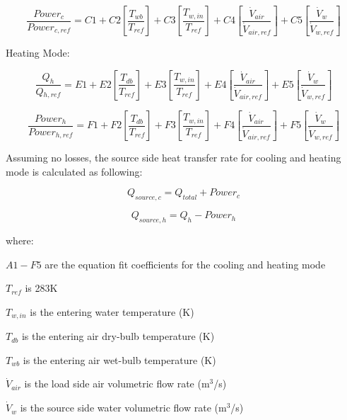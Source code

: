 \begin{equation}
\frac{{Power{}_c}}{{Power{}_{c,ref}}} = C1 + C2\left[ {\frac{{{T_{wb}}}}{{{T_{ref}}}}} \right] + C3\left[ {\frac{{T{}_{w,in}}}{{T{}_{ref}}}} \right] + C4\left[ {\frac{{{{\dot V}_{air}}}}{{{{\dot V}_{air,ref}}}}} \right] + C5\left[ {\frac{{{{\dot V}_w}}}{{{{\dot V}_{w,ref}}}}} \right]
\end{equation}

Heating Mode:

\begin{equation}
\frac{{{Q_h}}}{{Q{}_{h,ref}}} = E1 + E2\left[ {\frac{{{T_{db}}}}{{{T_{ref}}}}} \right] + E3\left[ {\frac{{T{}_{w,in}}}{{T{}_{ref}}}} \right] + E4\left[ {\frac{{{{\dot V}_{air}}}}{{{{\dot V}_{air,ref}}}}} \right] + E5\left[ {\frac{{{{\dot V}_w}}}{{{{\dot V}_{w,ref}}}}} \right]
\end{equation}

\begin{equation}
\frac{{Power{_h}}}{{Power{}_{h,ref}}} = F1 + F2\left[ {\frac{{{T_{db}}}}{{{T_{ref}}}}} \right] + F3\left[ {\frac{{T{}_{w,in}}}{{T{}_{ref}}}} \right] + F4\left[ {\frac{{{{\dot V}_{air}}}}{{{{\dot V}_{air,ref}}}}} \right] + F5\left[ {\frac{{{{\dot V}_w}}}{{{{\dot V}_{w,ref}}}}} \right]
\end{equation}

Assuming no losses, the source side heat transfer rate for cooling and heating mode is calculated as following:

\begin{equation}
{Q_{source,c}} = {Q_{total}} + Powe{r_c}
\end{equation}

\begin{equation}
{Q_{source,h}} = {Q_h} - Powe{r_h}
\end{equation}

where:

\(A1 - F5\) are the equation fit coefficients for the cooling and heating mode

\({T_{ref}}\) is 283K

\({T_{w,in}}\) is the entering water temperature (K)

\({T_{db}}\) is the entering air dry-bulb temperature (K)

\({T_{wb}}\) is the entering air wet-bulb temperature (K)

\({\dot V_{air}}\) is the load side air volumetric flow rate (m\(^{3}\)/s)

\({\dot V_w}\) is the source side water volumetric flow rate (m\(^{3}\)/s)

